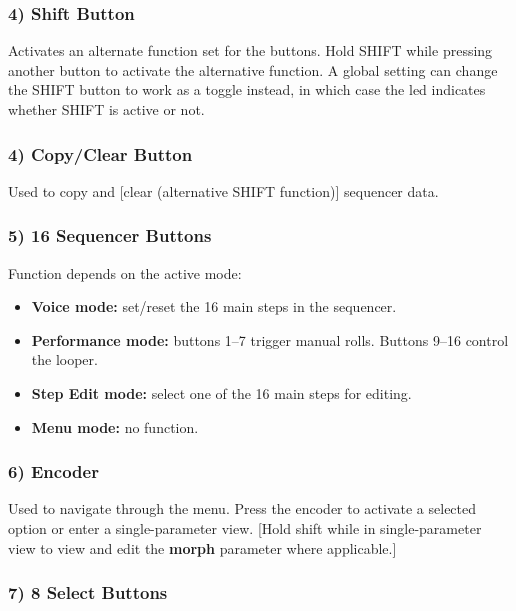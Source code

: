 \subsubsection{4) Shift Button}\label{shift-button}

Activates an alternate function set for the buttons. Hold SHIFT while
pressing another button to activate the alternative function. A global
setting can change the SHIFT button to work as a toggle instead, in
which case the led indicates whether SHIFT is active or not.

\subsubsection{4) Copy/Clear Button}\label{copyclear-button}

Used to copy and {[}clear (alternative SHIFT function){]} sequencer
data.

\subsubsection{5) 16 Sequencer Buttons}\label{sequencer-buttons}

Function depends on the active mode:

\begin{itemize}
\tightlist
\item
  \textbf{Voice mode:} set/reset the 16 main steps in the sequencer.
\item
  \textbf{Performance mode:} buttons 1--7 trigger manual rolls. Buttons
  9--16 control the looper.
\item
  \textbf{Step Edit mode:} select one of the 16 main steps for editing.
\item
  \textbf{Menu mode:} no function.
\end{itemize}

\subsubsection{6) Encoder}\label{encoder}

Used to navigate through the menu. Press the encoder to activate a
selected option or enter a single-parameter view. {[}Hold shift while in
single-parameter view to view and edit the \textbf{morph} parameter
where applicable.{]}

\subsubsection{7) 8 Select Buttons}\label{select-buttons}

